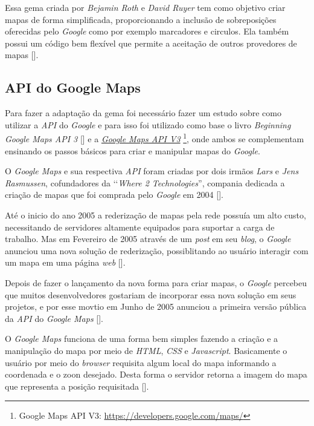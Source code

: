 Essa gema criada por \emph{Bejamin Roth} e \emph{David Ruyer} tem como objetivo criar mapas de forma 
simplificada, proporcionando a inclusão de sobreposições oferecidas pelo \emph{Google} como por exemplo 
marcadores e circulos. Ela também possui um código bem flexível que permite a aceitação de outros 
provedores de mapas [].

\subsection{API do Google Maps} 
\label{subsection:api_do_google_maps} 
 
Para fazer a adaptação da gema foi necessário fazer um estudo sobre como utilizar a \emph{API} do 
\emph{Google} e para isso foi utilizado como base o livro \emph{Beginning Google Maps API 3} 
[] e a 
\emph{\href{https://developers.google.com/maps/}{Google Maps API V3}} 
\footnote{Google Maps API V3: \url{https://developers.google.com/maps/}}, onde ambos se complementam 
ensinando os passos básicos para criar e manipular mapas do \emph{Google}. 

O \emph{Google Maps} e sua respectiva \emph{API} foram criadas por dois irmãos \emph{Lars} e 
\emph{Jens Rasmussen}, cofundadores da ‘‘\emph{Where 2 Technologies}'', compania dedicada a criação de mapas
que foi comprada pelo \emph{Google} em 2004 [].

Até o inicio do ano 2005 a rederização de mapas pela rede possuía um alto custo, necessitando de 
servidores altamente equipados para suportar a carga de trabalho. Mas em Fevereiro de 2005 através 
de um \emph{post} em seu \emph{blog}, o \emph{Google} anunciou uma nova solução de rederização, 
possiblitando ao usuário interagir com um mapa em uma página \emph{web}
[].

Depois de fazer o lançamento da nova forma para criar mapas, o \emph{Google} percebeu que 
muitos desenvolvedores gostariam de incorporar essa nova solução em seus projetos, e por esse 
movtio em Junho de 2005 anunciou a primeira versão pública da \emph{API} do \emph{Google Maps}
[].

O \emph{Google Maps} funciona de uma forma bem simples fazendo a criação e a manipulação do mapa
por meio de \emph{HTML}, \emph{CSS} e \emph{Javascript}. Basicamente o usuário por meio do \emph{browser}
requisita algum local do mapa informando a coordenada e o zoon desejado. Desta forma o servidor retorna a 
imagem do mapa que representa a posição requisitada []. 

